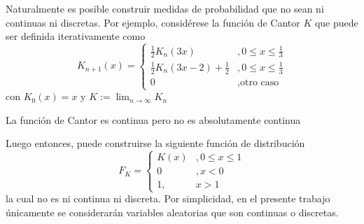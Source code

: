 Naturalmente es posible construir medidas de probabilidad que no sean ni continuas ni discretas. Por ejemplo, considérese la función de Cantor $K$ que puede ser definida iterativamente como
\begin{equation}
K_{n+1}(x) =
\begin{cases}
\frac{1}{2} K_n(3 x) &, 0\leq x \leq \frac{1}{3} \\
\frac{1}{2} K_n(3 x-2) + \frac{1}{2} &, 0\leq x \leq \frac{1}{3} \\
0 &, \text{otro caso}
\end{cases}
\end{equation}
con $K_0(x) = x$ y $K := \lim_{n\rightarrow \infty} K_n$


\begin{proposicion}
La función de Cantor es continua pero no es absolutamente continua
\end{proposicion}

Luego entonces, puede construirse la siguiente función de distribución
\begin{equation}
F_K = \begin{cases}
K(x) &, 0\leq x \leq 1 \\
0 &, x < 0 \\
1 ,& x > 1
\end{cases}
\end{equation}
la cual no es ni continua ni discreta. Por simplicidad, en el presente trabajo únicamente se considerarán variables aleatorias que son continuas o discretas.




